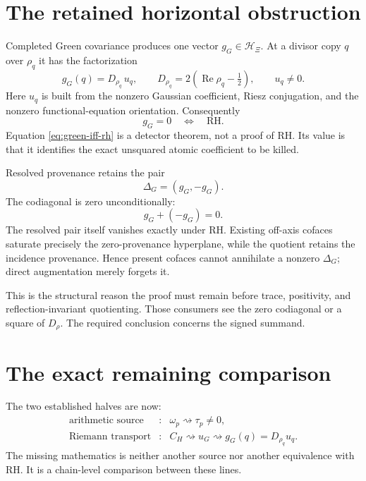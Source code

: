 \documentclass[11pt]{article}
\theoremstyle{definition}
\theoremstyle{remark}
\numberwithin{equation}{section}
\newcommand{\cH}{\mathcal H}
\newcommand{\Rea}{\operatorname{Re}}
\begin{document}
\section{The retained horizontal obstruction}

Completed Green covariance produces one vector $g_G\in\cH_\Xi$.  At a
divisor copy $q$ over $\rho_q$ it has the factorization
\begin{equation}
             g_G(q)=D_{\rho_q}\,u_q,
       \qquad D_{\rho_q}=2(\Rea\rho_q-\tfrac12),
       \qquad u_q\ne0.
 \label{eq:charge-factorization}
\end{equation}
Here $u_q$ is built from the nonzero Gaussian coefficient, Riesz
conjugation, and the nonzero functional-equation orientation.  Consequently
\begin{equation}
                  g_G=0\quad\Longleftrightarrow\quad\text{RH}.
 \label{eq:green-iff-rh}
\end{equation}
Equation \eqref{eq:green-iff-rh} is a detector theorem, not a proof of RH.
Its value is that it identifies the exact unsquared atomic coefficient to
be killed.

Resolved provenance retains the pair
\begin{equation}
                              \Delta_G=(g_G,-g_G).
 \label{eq:antidiagonal}
\end{equation}
The codiagonal is zero unconditionally:
\[
                              g_G+(-g_G)=0.
\]
The resolved pair itself vanishes exactly under RH.  Existing off-axis
cofaces saturate precisely the zero-provenance hyperplane, while the quotient
retains the incidence provenance.  Hence present cofaces cannot annihilate a
nonzero $\Delta_G$; direct augmentation merely forgets it.

This is the structural reason the proof must remain before trace,
positivity, and reflection-invariant quotienting.  Those consumers see the
zero codiagonal or a square of $D_\rho$.  The required conclusion concerns
the signed summand.

\section{The exact remaining comparison}

The two established halves are now:
\begin{equation}
 \begin{array}{ccl}
 \text{arithmetic source} &:&
       \omega_p\rightsquigarrow\tau_p\ne0,\\[1mm]
 \text{Riemann transport} &:&
       C_H\rightsquigarrow u_G\rightsquigarrow
       g_G(q)=D_{\rho_q}u_q.
 \end{array}
 \label{eq:two-halves}
\end{equation}
The missing mathematics is neither another source nor another equivalence
with RH.  It is a chain-level comparison between these lines.
\end{document}
